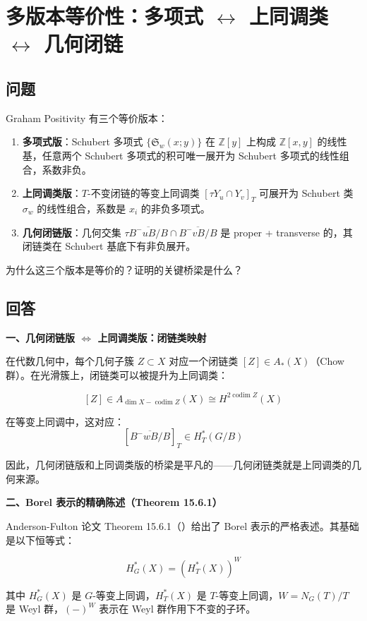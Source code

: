 \section{多版本等价性：多项式 $\leftrightarrow$ 上同调类 $\leftrightarrow$ 几何闭链}\label{sec:qa-MultiVersionEquivalence}
\subsection{问题}
Graham Positivity 有三个等价版本：
\begin{enumerate}
\item \textbf{多项式版}：Schubert 多项式 $\{\mathfrak{S}_w(x;y)\}$ 在 $\mathbb{Z}[y]$ 上构成 $\mathbb{Z}[x,y]$ 的线性基，任意两个 Schubert 多项式的积可唯一展开为 Schubert 多项式的线性组合，系数非负。
\item \textbf{上同调类版}：$T$-不变闭链的等变上同调类 $[\tau Y_u \cap Y_v]_T$ 可展开为 Schubert 类 $\sigma_w$ 的线性组合，系数是 $x_i$ 的非负多项式。
\item \textbf{几何闭链版}：几何交集 $\tau \overline{B^-uB/B} \cap \overline{B^-vB/B}$ 是 proper + transverse 的，其闭链类在 Schubert 基底下有非负展开。
\end{enumerate}
为什么这三个版本是等价的？证明的关键桥梁是什么？

\subsection{回答}

\textbf{一、几何闭链版 $\Longleftrightarrow$ 上同调类版：闭链类映射}

在代数几何中，每个几何子簇 $Z \subset X$ 对应一个闭链类 $[Z] \in A_*(X)$（Chow 群）。在光滑簇上，闭链类可以被提升为上同调类：

$$[Z] \in A_{\dim X - \operatorname{codim} Z}(X) \cong H^{2\operatorname{codim} Z}(X)$$

在等变上同调中，这对应：
$$[\overline{B^-wB/B}]_T \in H_T^*(G/B)$$

因此，几何闭链版和上同调类版的桥梁是平凡的——几何闭链类就是上同调类的几何来源。

\textbf{二、Borel 表示的精确陈述（Theorem 15.6.1）}

Anderson-Fulton 论文 Theorem 15.6.1（\cite[ Theorem 15.6.1]{anderson2023}）给出了 Borel 表示的严格表述。其基础是以下恒等式：

$$H_G^*(X) = (H_T^*(X))^W$$

其中 $H_G^*(X)$ 是 $G$-等变上同调，$H_T^*(X)$ 是 $T$-等变上同调，$W = N_G(T)/T$ 是 Weyl 群，$(-)^W$ 表示在 Weyl 群作用下不变的子环。

